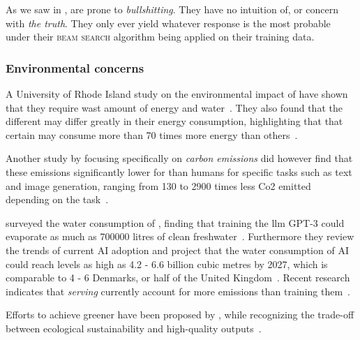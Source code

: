 As we saw in ,  are prone to
\textit{bullshitting}. They have no intuition of, or concern with \textit{the
    truth}. They only ever yield whatever response is the most probable under their
\textsc{beam search} algorithm being applied on their training data.

\subsubsection{Environmental concerns}

A University of Rhode Island study on the environmental impact of  have shown that
they require wast amount of energy and water~\cite{hungryLlm}. They also found that the different
 may differ greatly in their energy consumption, highlighting that that certain
 may consume more than \num{70} times more energy than others~\cite{hungryLlm}.

Another study by \citeauthor{llmCarbon} focusing specifically on \textit{carbon emissions} did
however find that these emissions significantly lower for  than humans for specific
tasks such as text and image generation, ranging from \num{130} to \num{2900} times less Co2 emitted
depending on the task~\cite[1]{llmCarbon}.

\citeauthor{thirstyLlm} surveyed the water consumption of , finding that training the
\acrshort{llm} \textsc{GPT-3} could evaporate as much as \num{700000} litres of clean
freshwater~\cite[1]{thirstyLlm}. Furthermore they review the trends of current AI adoption and
project that the water consumption of AI could reach levels as high as \num{4.2} - \num{6.6} billion
cubic metres by \num{2027}, which is comparable to \num{4} - \num{6} Denmarks, or half of the United
Kingdom~\cite[1]{thirstyLlm}. Recent research indicates that \textit{serving} 
currently account for more emissions than training them~\cite[37]{sustainableLlmServing}.

Efforts to achieve greener  have been proposed by \citeauthor{sproutGreenLlm}, while
recognizing the trade-off between ecological sustainability and high-quality
outputs~\cite[21799]{sproutGreenLlm}.


